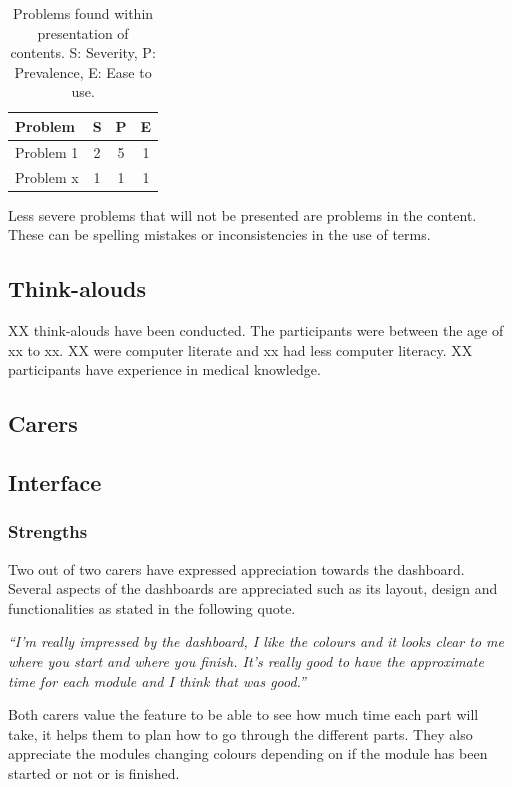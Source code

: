\documentclass{sigchi}
\begin{document}
\begin{table}[H]
    \centering
    \begin{tabular}{|m{6.5cm}|c|c|c|}
    \hline
        \textbf{Problem} & \textbf{S} & \textbf{P} & \textbf{E}\\
    \hline
         Problem 1  & 2 & 5 & 1\\
    \hline
         Problem x & 1 & 1 & 1\\
    \hline
    \end{tabular}
    \caption{Problems found within presentation of contents. S: Severity, P: Prevalence, E: Ease to use.}
    \label{tab:content}
\end{table}

Less severe problems that will not be presented are problems in the content. These can be spelling mistakes or inconsistencies in the use of terms. 

\subsection{Think-alouds}
XX think-alouds have been conducted. The participants were between the age of xx to xx. XX were computer literate and xx had less computer literacy. XX participants have experience in medical knowledge. 

\subsection{Carers}

\subsection{Interface}
\subsubsection{Strengths}
Two out of two carers have expressed appreciation towards the dashboard. Several aspects of the dashboards are appreciated such as its layout, design and functionalities as stated in the following quote.  

\textit{“I’m really impressed by the dashboard, I like the colours and it looks clear to me where you start and where you finish. It’s really good to have the approximate time for each module and I think that was good.”}

Both carers value the feature to be able to see how much time each part will take, it helps them to plan how to go through the different parts. They also appreciate the modules changing colours depending on if the module has been started or not or is finished.
\end{document}
